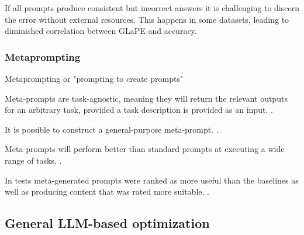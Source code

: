 If all prompts produce consistent but incorrect answers it is challenging to discern the error without external resources. This happens in some datasets, leading to diminished correlation between GLaPE and accuracy. \cite{zhang2024glapegoldlabelagnosticprompt}


\subsubsection{Metaprompting}
Metaprompting or "prompting to create prompts"

Meta-prompts are task-agnostic, meaning they will return the relevant outputs for an arbitrary task, provided a task description is provided as an input.  \cite{dewynter2024metaprompting}.

It is possible to construct a general-purpose meta-prompt. \cite{dewynter2024metaprompting}.

Meta-prompts will perform better than standard prompts at executing a wide range of tasks.  \cite{dewynter2024metaprompting}.

In tests meta-generated prompts were ranked as more useful than the baselines as well as producing content that was rated more suitable.  \cite{dewynter2024metaprompting}.

\subsection{General LLM-based optimization}